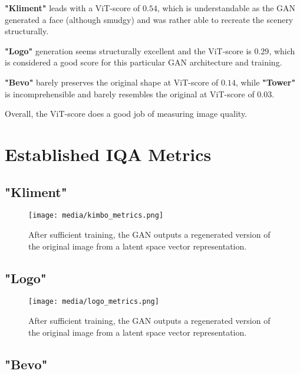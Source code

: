\textbf{"Kliment"} leads with a ViT-score of $0.54$, which is understandable as the GAN 
generated a face (although smudgy) and was rather able to recreate the scenery structurally.

\textbf{"Logo"} generation seems structurally excellent and the ViT-score is $0.29$, which
is considered a good score for this particular GAN architecture and training.

\textbf{"Bevo"} barely preserves the original shape at ViT-score of $0.14$, while
\textbf{"Tower"} is incomprehensible and barely resembles the original at ViT-score of $0.03$.


Overall, the ViT-score does a good job of measuring image quality.


\section{Established IQA Metrics}

\subsection{"Kliment"}

\begin{figure}[H]
	\begin{center}
	\texttt{[image: media/kimbo\_metrics.png]}
	\end{center}
	\caption["Kliment" Established Metrics]{After sufficient training, the GAN outputs a regenerated
    version of the original image from a latent space vector representation.}
	\end{figure}

\subsection{"Logo"}

\begin{figure}[H]
	\begin{center}
	\texttt{[image: media/logo\_metrics.png]}
	\end{center}
	\caption["Logo" Established Metrics]{After sufficient training, the GAN outputs a regenerated
    version of the original image from a latent space vector representation.}
	\end{figure}


\subsection{"Bevo"}

